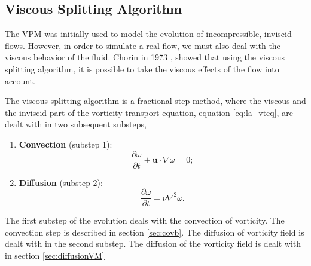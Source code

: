 \subsection{Viscous Splitting Algorithm}
\label{subsec:vsa}
The VPM was initially used to model the evolution of incompressible, inviscid flows. However, in order to simulate a real flow, we must also deal with the viscous behavior of the fluid. Chorin in 1973 \cite{Chorin1973a}, showed that using the viscous splitting algorithm, it is possible to take the viscous effects of the flow into account. 

The viscous splitting algorithm is a fractional step method, where the viscous and the inviscid part of the vorticity transport equation, equation \ref{eq:la_vteq}, are dealt with in two subsequent substeps,

	\begin{enumerate}
	\item \textbf{Convection} (substep 1):
		\begin{equation}
		\frac{\partial\omega}{\partial t} + \mathbf{u}\cdot\nabla\omega=0;
		\label{eq:convectionEulerian}
		\end{equation}
		
	\item \textbf{Diffusion} (substep 2):
		\begin{equation}
		\frac{\partial\omega}{\partial t} = \nu\nabla^2\omega.
		\label{eq:vsa2}
		\end{equation}
	\end{enumerate}

The first substep of the evolution deals with the convection of vorticity. The convection step is described in section \ref{sec:covb}. The diffusion of vorticity field is dealt with in the second substep. The diffusion of the vorticity field is dealt with in section \ref{sec:diffusionVM}



